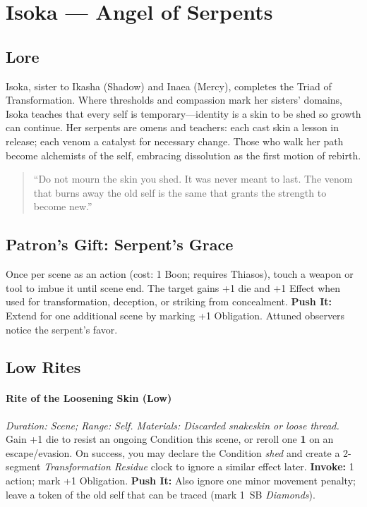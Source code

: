 \section{Isoka --- Angel of Serpents}
\label{patron:isoka}

\subsection*{Lore}
%
Isoka, sister to Ikasha (Shadow) and Inaea (Mercy), completes the Triad of Transformation. Where thresholds and compassion mark her sisters' domains, Isoka teaches that every self is temporary---identity is a skin to be shed so growth can continue. Her serpents are omens and teachers: each cast skin a lesson in release; each venom a catalyst for necessary change. Those who walk her path become alchemists of the self, embracing dissolution as the first motion of rebirth.

\begin{quote}
``Do not mourn the skin you shed. It was never meant to last. The venom that burns away the old self is the same that grants the strength to become new.''
\end{quote}

\subsection*{Patron's Gift: Serpent's Grace}
Once per scene as an action (cost: 1 Boon; requires Thiasos), touch a weapon or tool to imbue it until scene end. The target gains +1 die and +1 Effect when used for transformation, deception, or striking from concealment.  
\textbf{Push It:} Extend for one additional scene by marking +1 Obligation. Attuned observers notice the serpent's favor.

\subsection*{Low Rites}
\paragraph{Rite of the Loosening Skin (Low)}%
\emph{Duration: Scene; Range: Self. Materials: Discarded snakeskin or loose thread.}  
Gain +1 die to resist an ongoing Condition this scene, or reroll one \textbf{1} on an escape/evasion. On success, you may declare the Condition \emph{shed} and create a 2-segment \emph{Transformation Residue} clock to ignore a similar effect later.  
\textbf{Invoke:} 1 action; mark +1 Obligation.  
\textbf{Push It:} Also ignore one minor movement penalty; leave a token of the old self that can be traced (mark 1~SB \emph{Diamonds}).

